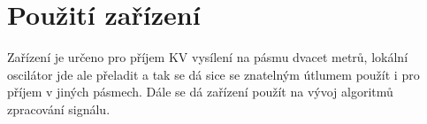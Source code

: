 \section{Použití zařízení}
	Zařízení je určeno pro příjem KV vysílení na pásmu dvacet metrů, lokální oscilátor jde ale přeladit a tak se dá sice se znatelným útlumem použít i pro příjem v jiných pásmech. Dále se dá zařízení použít na vývoj algoritmů zpracování signálu.
